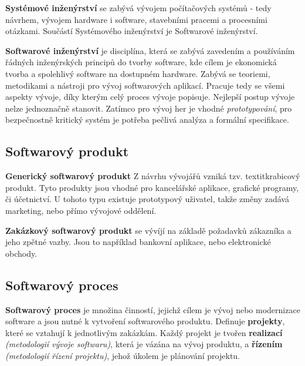 \documentclass[11pt,a4paper]{book}   %
\begin{document}

\textbf{Systémové inženýrství} se zabývá vývojem počítačových systémů - tedy návrhem, vývojem hardware i software, stavebními pracemi a procesními otázkami. Součástí Systémového inženýrství je Softwarové inženýrství.


\textbf{Softwarové inženýrství} je disciplína, která se zabývá zavedením a používáním řádných inženýrských principů do tvorby software, kde cílem je ekonomická tvorba a spolehlivý software na dostupném hardware. Zabývá se teoriemi, metodikami a nástroji pro vývoj softwarových aplikací. Pracuje tedy se všemi aspekty vývoje, díky kterým celý proces vývoje popisuje. 
Nejlepší postup vývoje nelze jednoznačně stanovit. Zatímco pro vývoj her je vhodné \textit{prototypování}, pro bezpečnostně kritický systém je potřeba pečlivá analýza a formální specifikace.

\subsection{Softwarový produkt}

\textbf{Generický softwarový produkt} Z návrhu vývojářů vzniká tzv. textit{krabicový produkt}. Tyto produkty jsou vhodné pro kancelářské aplikace, grafické programy, či účetnictví. U tohoto typu existuje prototypový uživatel, takže změny zadává marketing, nebo přímo vývojové oddělení.

\textbf{Zakázkový softwarový produkt} se vývíjí na základě požadavků zákazníka a jeho zpětné vazby. Jsou to například bankovní aplikace, nebo elektronické obchody.

\subsection{Softwarový proces}
\textbf{Softwarový proces} je množina činností, jejichž cílem je vývoj nebo modernizace software a jsou nutné k vytvoření softwarového produktu. Definuje \textbf{projekty}, které se vztahují k jednotlivým zakázkám. Každý projekt je tvořen \textbf{realizací} \textit{(metodologií vývoje softwaru)}, která je vázána na vývoj produktu, a \textbf{řízením} \textit{(metodologií řízení projektu)}, jehož úkolem je plánování projektu. 
\end{document}
